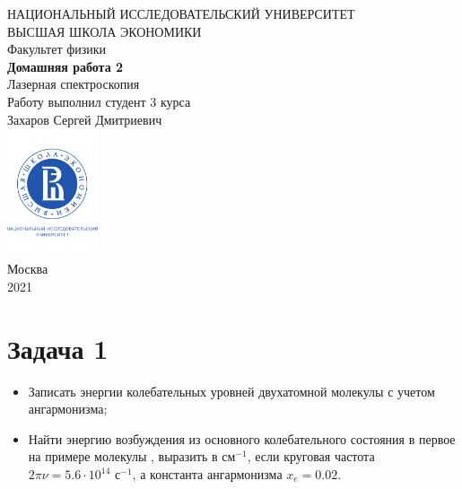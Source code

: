 \documentclass[a4paper, 12pt]{article}
\begin{document}
	\begin{titlepage}
		\begin{center}
			$$$$
			$$$$
			$$$$
			$$$$
			{\Large{НАЦИОНАЛЬНЫЙ ИССЛЕДОВАТЕЛЬСКИЙ УНИВЕРСИТЕТ}}\\
			\vspace{0.1cm}
			{\Large{ВЫСШАЯ ШКОЛА ЭКОНОМИКИ}}\\
			\vspace{0.25cm}
			{\large{Факультет физики}}\\
			\vspace{5.5cm}
			{\Huge\textbf{{Домашняя работа 2}}}\\%
			\vspace{1cm}
			{\LARGE{Лазерная спектроскопия}}\\%
			\vspace{2cm}
			{Работу выполнил студент 3 курса}\\
			{Захаров Сергей Дмитриевич}\\
			\vfill
			\includegraphics[width = 0.2\textwidth]{HSElogo}\\
			\vfill
			Москва\\
			2021
		\end{center}
	\end{titlepage}


\newpage

\section*{Задача 1}

\begin{itemize}
	\item Записать энергии колебательных уровней двухатомной молекулы с учетом ангармонизма;
	
	\item Найти энергию возбуждения из основного колебательного состояния в первое на примере молекулы , выразить в см$^{-1}$, если круговая частота $2\pi\nu = 5.6 \cdot 10^{14}$ с$^{-1}$, а константа ангармонизма  $x_e = 0.02$.
\end{itemize}
\end{document}
